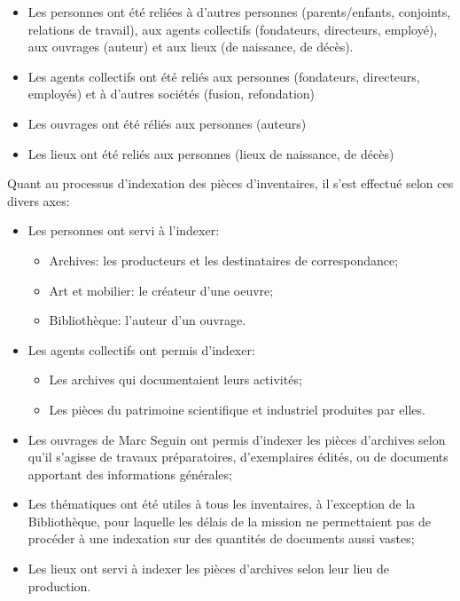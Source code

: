 \documentclass[a4paper,12pt,twoside]{book}
\begin{document}
\begin{itemize}
    \item Les personnes ont été reliées à d'autres personnes (parents/enfants, conjoints, relations de travail), aux agents collectifs (fondateurs, directeurs, employé), aux ouvrages (auteur) et aux lieux (de naissance, de décès).
    \item Les agents collectifs ont été reliés aux personnes (fondateurs, directeurs, employés) et à d'autres sociétés (fusion, refondation)
    \item Les ouvrages ont été réliés aux personnes (auteurs)
    \item Les lieux ont été reliés aux personnes (lieux de naissance, de décès)
\end{itemize}
\bigskip
Quant au processus d'indexation des pièces d'inventaires, il s'est effectué selon ces divers axes: 
\begin{itemize}
    \item Les personnes ont servi à l'indexer: 
    \begin{itemize}
        \item Archives: les producteurs et les destinataires de correspondance;
        \item Art et mobilier: le créateur d'une oeuvre;
        \item Bibliothèque: l'auteur d'un ouvrage.
    \end{itemize}
    \item Les agents collectifs ont permis d'indexer:
    \begin{itemize}
        \item Les archives qui documentaient leurs activités;
        \item Les pièces du patrimoine scientifique et industriel produites par elles.
    \end{itemize}
    \item Les ouvrages de Marc Seguin ont permis d'indexer les pièces d'archives selon qu'il s'agisse de travaux préparatoires, d'exemplaires édités, ou de documents apportant des informations générales;
    \item Les thématiques ont été utiles à tous les inventaires, à l'exception de la Bibliothèque, pour laquelle les délais de la mission ne permettaient pas de procéder à une indexation sur des quantités de documents aussi vastes;
    \item Les lieux ont servi à indexer les pièces d'archives selon leur lieu de production.
\end{itemize}
\end{document}
